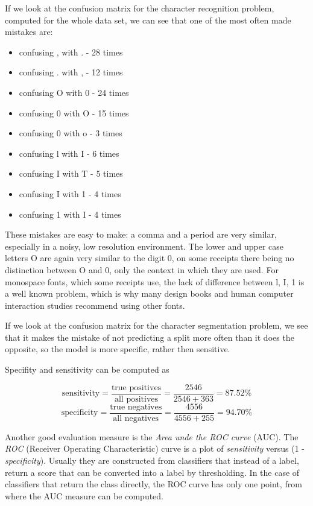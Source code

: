 If we look at the confusion matrix for the character recognition problem, computed for the whole data set, we can see that one of the most often made mistakes are:
\begin{itemize}
\item confusing , with . - 28 times
\item confusing . with , - 12 times
\item confusing O with 0 - 24 times
\item confusing 0 with O - 15 times
\item confusing 0 with o - 3 times
\item confusing l with I - 6 times
\item confusing I with T - 5 times
\item confusing I with 1 - 4 times
\item confusing 1 with I - 4 times
\end{itemize} 

These mistakes are easy to make: a comma and a period are very similar, especially in a noisy, low resolution environment. The lower and upper case letters O are again very similar to the digit 0, on some receipts there being no distinction between O and 0, only the context in which they are used. For monospace fonts, which some receipts use, the lack of difference between l, I, 1 is a well known problem, which is why many design books and human computer interaction studies recommend using other fonts\cite{chaparro2006examining}. 

If we look at the confusion matrix for the character segmentation problem, we see that it makes the mistake of not predicting a split more often than it does the opposite, so the model is more specific, rather then sensitive. 

Specifity and sensitivity can be computed as\cite{Fawcett_2006}

\[
    \text{sensitivity} = \frac{\text{true positives}}{\text{all positives}} = \frac{2546}{2546+363} = 87.52 \%
\]
\[
    \text{specificity} = \frac{\text{true negatives}}{\text{all negatives}} = \frac{4556}{4556+255} =  94.70 \%
\]

Another good evaluation measure is the \textit{Area unde the ROC curve} (AUC)\cite{Fawcett_2006}. The \textit{ROC} (Receiver Operating Characteristic) curve is a plot of \textit{sensitivity} versus (1 - \textit{specificity}). Usually they are constructed from classifiers that instead of a label, return a score that can be converted into a label by thresholding. In the case of classifiers that return the class directly, the ROC curve has only one point, from where the AUC measure can be computed. 

